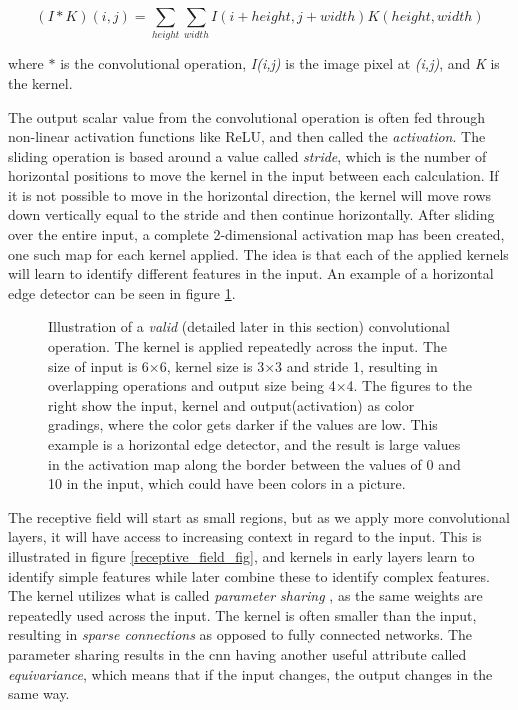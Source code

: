         \begin{equation}
            (I*K)(i,j) = \sum_{height}\sum_{width}I(i+height,j+width)K(height,width)
        \end{equation}
     
     where $*$ is the convolutional operation, \textit{I(i,j)} is the image pixel at \textit{(i,j)}, and \textit{K} is the kernel.
     
     The output scalar value from the convolutional operation is often fed through non-linear activation functions like ReLU, and then called the \textit{activation}. The sliding operation is based around a value called \textit{stride}, which is the number of horizontal positions to move the kernel in the input between each calculation. If it is not possible to move in the horizontal direction, the kernel will move rows down vertically equal to the stride and then continue horizontally. After sliding over the entire input, a complete 2-dimensional activation map has been created, one such map for each kernel applied. The idea is that each of the applied kernels will learn to identify different features in the input. An example of a horizontal edge detector can be seen in figure \ref{convolutional_fig}\cite{o2015introduction_convolutions}. 
    \begin{figure}[H]
        \centering
                
        \caption[Horizontal edge detector example]{Illustration of a \textit{valid} (detailed later in this section) convolutional operation. The kernel is applied repeatedly across the input. The size of input is 6×6, kernel size is 3×3 and stride 1, resulting in overlapping operations and output size being 4×4. The figures to the right show the input, kernel and output(activation) as color gradings, where the color gets darker if the values are low. This example is a horizontal edge detector, and the result is large values in the activation map along the border between the values of 0 and 10 in the input, which could have been colors in a picture.}
      	\medskip 
        \label{convolutional_fig}
    \end{figure}
    
    The receptive field will start as small regions, but as we apply more convolutional layers, it will have access to increasing context in regard to the input\cite{Goodfellow-et-al-2016}. This is illustrated in figure \ref{receptive_field_fig}, and kernels in early layers learn to identify simple features while later combine these to identify complex features. The kernel utilizes what is called \textit{parameter sharing }, as the same weights are repeatedly used across the input. The kernel is often smaller than the input, resulting in \textit{sparse connections} as opposed to fully connected networks. The parameter sharing results in the \gls{cnn} having another useful attribute called \textit{equivariance}, which means that if the input changes, the output changes in the same way.
    
